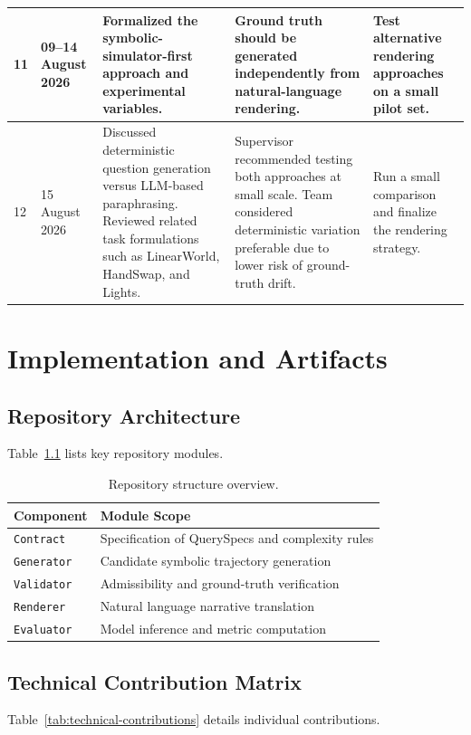 \documentclass{iutbscthesis}
\begin{document}
\begin{appendices}
\begin{longtable}{@{}p{}p{}p{}p{}p{}@{}}
\hline
11 & 09--14 August 2026 & Formalized the symbolic-simulator-first approach and experimental variables. & Ground truth should be generated independently from natural-language rendering. & Test alternative rendering approaches on a small pilot set. \\
\hline
12 & 15 August 2026 & Discussed deterministic question generation versus LLM-based paraphrasing. Reviewed related task formulations such as LinearWorld, HandSwap, and Lights. & Supervisor recommended testing both approaches at small scale. Team considered deterministic variation preferable due to lower risk of ground-truth drift. & Run a small comparison and finalize the rendering strategy. \\
\hline
\end{longtable}
\endgroup

\chapter{Implementation and Artifacts}

\section{Repository Architecture}
Table~\ref{tab:repository-components} lists key repository modules.

\begin{table}[H]
\centering
\small
\begin{tabular}{ll}
\toprule
\textbf{Component} & \textbf{Module Scope} \\
\midrule
\texttt{Contract} & Specification of QuerySpecs and complexity rules \\
\texttt{Generator} & Candidate symbolic trajectory generation \\
\texttt{Validator} & Admissibility and ground-truth verification \\
\texttt{Renderer} & Natural language narrative translation \\
\texttt{Evaluator} & Model inference and metric computation \\
\bottomrule
\end{tabular}
\caption{Repository structure overview.}
\label{tab:repository-components}
\end{table}

\section{Technical Contribution Matrix}
Table~\ref{tab:technical-contributions} details individual contributions.


\end{appendices}
\end{document}
